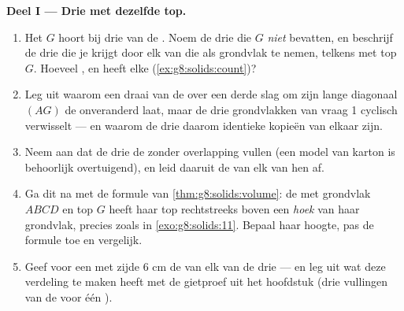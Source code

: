 \begin{problem}
\medskip
\noindent\textbf{Deel I --- Drie  met dezelfde top.}
\begin{enumerate}
  \item Het  $G$ hoort bij drie  van de . Noem de drie
         die $G$ \emph{niet} bevatten, en beschrijf de drie 
        die je krijgt door elk van die  als grondvlak te nemen, telkens
        met top $G$. Hoeveel ,  en  heeft elke 
        (\cref{ex:g8:solids:count})?
  \item Leg uit waarom een draai van de  over een derde slag om zijn lange
        diagonaal $(AG)$ de  onveranderd laat, maar de drie grondvlakken van
        vraag 1 cyclisch verwisselt --- en waarom de drie  daarom
        identieke kopieën van elkaar zijn.
  \item Neem aan dat de drie  de  zonder overlapping vullen (een
        model van karton is behoorlijk overtuigend), en leid daaruit de  van
        elk van hen af.
  \item Ga dit na met de formule van \cref{thm:g8:solids:volume}: de  met
        grondvlak $ABCD$ en top $G$ heeft haar top rechtstreeks boven een
        \emph{hoek} van haar grondvlak, precies zoals in
        \cref{exo:g8:solids:11}. Bepaal haar hoogte, pas de formule toe en
        vergelijk.
  \item Geef voor een  met zijde $6$ cm de  van elk van de drie
         --- en leg uit wat deze verdeling te maken heeft met de
        gietproef uit het hoofdstuk (drie vullingen van de  voor één
        ).
\end{enumerate}


\end{problem}

